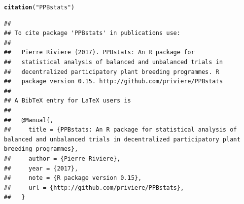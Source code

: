 \documentclass{book}\usepackage[]{graphicx}\usepackage[]{color}
\makeatletter
\newcommand{\hlstr}[1]{\textcolor[rgb]{0.192,0.494,0.8}{#1}}%
\newcommand{\hlstd}[1]{\textcolor[rgb]{0.345,0.345,0.345}{#1}}%
\newcommand{\hlkwd}[1]{\textcolor[rgb]{0.737,0.353,0.396}{\textbf{#1}}}%
\newenvironment{kframe}{%
 \def\at@end@of@kframe{}%
 \ifinner\ifhmode%
  \def\at@end@of@kframe{\end{minipage}}%
  \begin{minipage}{\columnwidth}%
 \fi\fi%
 \def\FrameCommand##1{\hskip\@totalleftmargin \hskip-\fboxsep
 \colorbox{shadecolor}{##1}\hskip-\fboxsep
     \hskip-\linewidth \hskip-\@totalleftmargin \hskip\columnwidth}%
 \MakeFramed {\advance\hsize-\width
   \@totalleftmargin\z@ \linewidth\hsize
   \@setminipage}}%
 {\par\unskip\endMakeFramed%
 \at@end@of@kframe}
\newenvironment{knitrout}{}{} %
\makeatother
\begin{document}
\begin{knitrout}
\color{fgcolor}\begin{kframe}
\begin{alltt}
\hlkwd{citation}\hlstd{(}\hlstr{"PPBstats"}\hlstd{)}
\end{alltt}
\begin{verbatim}
## 
## To cite package 'PPBstats' in publications use:
## 
##   Pierre Riviere (2017). PPBstats: An R package for
##   statistical analysis of balanced and unbalanced trials in
##   decentralized participatory plant breeding programmes. R
##   package version 0.15. http://github.com/priviere/PPBstats
## 
## A BibTeX entry for LaTeX users is
## 
##   @Manual{,
##     title = {PPBstats: An R package for statistical analysis of balanced and unbalanced trials in decentralized participatory plant breeding programmes},
##     author = {Pierre Riviere},
##     year = {2017},
##     note = {R package version 0.15},
##     url = {http://github.com/priviere/PPBstats},
##   }
\end{verbatim}
\end{kframe}
\end{knitrout}


\end{document}
